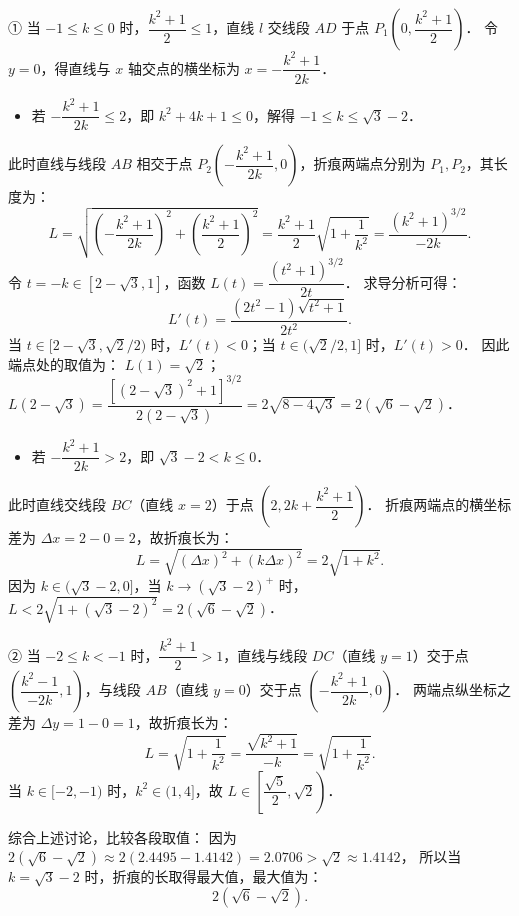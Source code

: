 \begin{answer}
① 当 $-1 \leqslant k \leqslant 0$ 时，$\dfrac{k^2+1}{2} \leqslant 1$，直线 $l$ 交线段 $AD$ 于点 $P_1\left(0, \dfrac{k^2+1}{2}\right)$．
令 $y = 0$，得直线与 $x$ 轴交点的横坐标为 $x = -\dfrac{k^2+1}{2k}$．
\begin{itemize}
\item 若 $-\dfrac{k^2+1}{2k} \leqslant 2$，即 $k^2 + 4k + 1 \leqslant 0$，解得 $-1 \leqslant k \leqslant \sqrt{3} - 2$．
\end{itemize}
  此时直线与线段 $AB$ 相交于点 $P_2\left(-\dfrac{k^2+1}{2k}, 0\right)$，折痕两端点分别为 $P_1, P_2$，其长度为：
\nopagebreak[4]
\[
L = \sqrt{\left(-\frac{k^2+1}{2k}\right)^2 + \left(\frac{k^2+1}{2}\right)^2} = \frac{k^2+1}{2}\sqrt{1 + \frac{1}{k^2}} = \frac{(k^2+1)^{3/2}}{-2k}.
\]
  令 $t = -k \in [2 - \sqrt{3}, 1]$，函数 $L(t) = \dfrac{(t^2+1)^{3/2}}{2t}$．
  求导分析可得：
\nopagebreak[4]
\[
L'(t) = \frac{(2t^2-1)\sqrt{t^2+1}}{2t^2}.
\]
  当 $t \in [2 - \sqrt{3}, \sqrt{2}/2)$ 时，$L'(t) < 0$；当 $t \in (\sqrt{2}/2, 1]$ 时，$L'(t) > 0$．
  因此端点处的取值为：
  $L(1) = \sqrt{2}$；
  $L(2 - \sqrt{3}) = \dfrac{[(2-\sqrt{3})^2+1]^{3/2}}{2(2-\sqrt{3})} = 2\sqrt{8 - 4\sqrt{3}} = 2(\sqrt{6} - \sqrt{2})$．
\begin{itemize}
\item 若 $-\dfrac{k^2+1}{2k} > 2$，即 $\sqrt{3} - 2 < k \leqslant 0$．
\end{itemize}
  此时直线交线段 $BC$（直线 $x = 2$）于点 $\left(2, 2k + \dfrac{k^2+1}{2}\right)$．
  折痕两端点的横坐标差为 $\Delta x = 2 - 0 = 2$，故折痕长为：
\nopagebreak[4]
\[
L = \sqrt{(\Delta x)^2 + (k\Delta x)^2} = 2\sqrt{1 + k^2}.
\]
  因为 $k \in (\sqrt{3} - 2, 0]$，当 $k \to (\sqrt{3} - 2)^+$ 时，$L < 2\sqrt{1 + (\sqrt{3}-2)^2} = 2(\sqrt{6} - \sqrt{2})$．

② 当 $-2 \leqslant k < -1$ 时，$\dfrac{k^2+1}{2} > 1$，直线与线段 $DC$（直线 $y = 1$）交于点 $\left(\dfrac{k^2-1}{-2k}, 1\right)$，与线段 $AB$（直线 $y = 0$）交于点 $\left(-\dfrac{k^2+1}{2k}, 0\right)$．
两端点纵坐标之差为 $\Delta y = 1 - 0 = 1$，故折痕长为：
\nopagebreak[4]
\[
L = \sqrt{1 + \frac{1}{k^2}} = \frac{\sqrt{k^2+1}}{-k} = \sqrt{1 + \frac{1}{k^2}}.
\]
当 $k \in [-2, -1)$ 时，$k^2 \in (1, 4]$，故 $L \in \left[\dfrac{\sqrt{5}}{2}, \sqrt{2}\right)$．

综合上述讨论，比较各段取值：
因为 $2(\sqrt{6} - \sqrt{2}) \approx 2(2.4495 - 1.4142) = 2.0706 > \sqrt{2} \approx 1.4142$，
所以当 $k = \sqrt{3} - 2$ 时，折痕的长取得最大值，最大值为：
\nopagebreak[4]
\[
2(\sqrt{6} - \sqrt{2}).
\]



\end{answer}